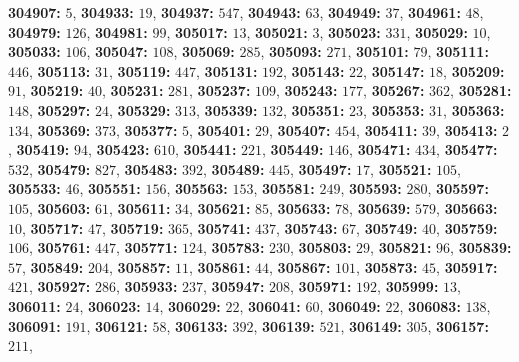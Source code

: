 \textsf{\bfseries 304907:} $5$, \textsf{\bfseries 304933:} $19$, \textsf{\bfseries 304937:} $547$, \textsf{\bfseries 304943:} $63$, \textsf{\bfseries 304949:} $37$, \textsf{\bfseries 304961:} $48$, \textsf{\bfseries 304979:} $126$, \textsf{\bfseries 304981:} $99$, \textsf{\bfseries 305017:} $13$, \textsf{\bfseries 305021:} $3$, \textsf{\bfseries 305023:} $331$, \textsf{\bfseries 305029:} $10$, \textsf{\bfseries 305033:} $106$, \textsf{\bfseries 305047:} $108$, \textsf{\bfseries 305069:} $285$, \textsf{\bfseries 305093:} $271$, \textsf{\bfseries 305101:} $79$, \textsf{\bfseries 305111:} $446$, \textsf{\bfseries 305113:} $31$, \textsf{\bfseries 305119:} $447$, \textsf{\bfseries 305131:} $192$, \textsf{\bfseries 305143:} $22$, \textsf{\bfseries 305147:} $18$, \textsf{\bfseries 305209:} $91$, \textsf{\bfseries 305219:} $40$, \textsf{\bfseries 305231:} $281$, \textsf{\bfseries 305237:} $109$, \textsf{\bfseries 305243:} $177$, \textsf{\bfseries 305267:} $362$, \textsf{\bfseries 305281:} $148$, \textsf{\bfseries 305297:} $24$, \textsf{\bfseries 305329:} $313$, \textsf{\bfseries 305339:} $132$, \textsf{\bfseries 305351:} $23$, \textsf{\bfseries 305353:} $31$, \textsf{\bfseries 305363:} $134$, \textsf{\bfseries 305369:} $373$, \textsf{\bfseries 305377:} $5$, \textsf{\bfseries 305401:} $29$, \textsf{\bfseries 305407:} $454$, \textsf{\bfseries 305411:} $39$, \textsf{\bfseries 305413:} $2$, \textsf{\bfseries 305419:} $94$, \textsf{\bfseries 305423:} $610$, \textsf{\bfseries 305441:} $221$, \textsf{\bfseries 305449:} $146$, \textsf{\bfseries 305471:} $434$, \textsf{\bfseries 305477:} $532$, \textsf{\bfseries 305479:} $827$, \textsf{\bfseries 305483:} $392$, \textsf{\bfseries 305489:} $445$, \textsf{\bfseries 305497:} $17$, \textsf{\bfseries 305521:} $105$, \textsf{\bfseries 305533:} $46$, \textsf{\bfseries 305551:} $156$, \textsf{\bfseries 305563:} $153$, \textsf{\bfseries 305581:} $249$, \textsf{\bfseries 305593:} $280$, \textsf{\bfseries 305597:} $105$, \textsf{\bfseries 305603:} $61$, \textsf{\bfseries 305611:} $34$, \textsf{\bfseries 305621:} $85$, \textsf{\bfseries 305633:} $78$, \textsf{\bfseries 305639:} $579$, \textsf{\bfseries 305663:} $10$, \textsf{\bfseries 305717:} $47$, \textsf{\bfseries 305719:} $365$, \textsf{\bfseries 305741:} $437$, \textsf{\bfseries 305743:} $67$, \textsf{\bfseries 305749:} $40$, \textsf{\bfseries 305759:} $106$, \textsf{\bfseries 305761:} $447$, \textsf{\bfseries 305771:} $124$, \textsf{\bfseries 305783:} $230$, \textsf{\bfseries 305803:} $29$, \textsf{\bfseries 305821:} $96$, \textsf{\bfseries 305839:} $57$, \textsf{\bfseries 305849:} $204$, \textsf{\bfseries 305857:} $11$, \textsf{\bfseries 305861:} $44$, \textsf{\bfseries 305867:} $101$, \textsf{\bfseries 305873:} $45$, \textsf{\bfseries 305917:} $421$, \textsf{\bfseries 305927:} $286$, \textsf{\bfseries 305933:} $237$, \textsf{\bfseries 305947:} $208$, \textsf{\bfseries 305971:} $192$, \textsf{\bfseries 305999:} $13$, \textsf{\bfseries 306011:} $24$, \textsf{\bfseries 306023:} $14$, \textsf{\bfseries 306029:} $22$, \textsf{\bfseries 306041:} $60$, \textsf{\bfseries 306049:} $22$, \textsf{\bfseries 306083:} $138$, \textsf{\bfseries 306091:} $191$, \textsf{\bfseries 306121:} $58$, \textsf{\bfseries 306133:} $392$, \textsf{\bfseries 306139:} $521$, \textsf{\bfseries 306149:} $305$, \textsf{\bfseries 306157:} $211$, 

